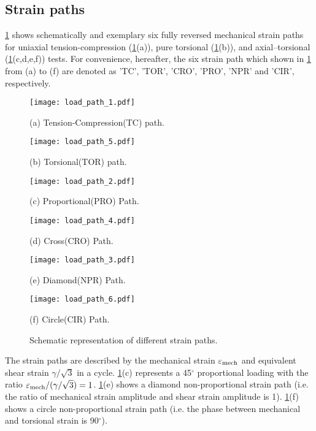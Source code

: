 \subsection{Strain paths}
\noindent
\ref{Fig:LoadPath} shows schematically and exemplary six fully reversed mechanical strain paths for uniaxial tension-compression (\ref{Fig:LoadPath}(a)), pure torsional (\ref{Fig:LoadPath}(b)), and axial–torsional (\ref{Fig:LoadPath}(c,d,e,f)) tests.
For convenience, hereafter, the six strain path which shown in \ref{Fig:LoadPath} from (a) to (f) are denoted as 'TC', 'TOR', 'CRO', 'PRO', 'NPR' and 'CIR', respectively.
\begin{figure}[ht]
  \begin{minipage}[t]{0.33\linewidth}
    \centering
    \texttt{[image: load\_path\_1.pdf]}
    \centerline{\small (a) Tension-Compression(TC) path.}
  \end{minipage}
  \begin{minipage}[t]{0.33\linewidth}
    \centering
    \texttt{[image: load\_path\_5.pdf]}
    \centerline{\small (b) Torsional(TOR) path.}
  \end{minipage}
  \begin{minipage}[t]{0.33\linewidth}
    \centering
    \texttt{[image: load\_path\_2.pdf]}
    \centerline{\small (c) Proportional(PRO) Path.}
  \end{minipage}%

  \begin{minipage}[t]{0.33\linewidth}
    \centering
    \texttt{[image: load\_path\_4.pdf]}
    \centerline{\small (d) Cross(CRO) Path.}
  \end{minipage}
  \begin{minipage}[t]{0.33\linewidth}
    \centering
    \texttt{[image: load\_path\_3.pdf]}
    \centerline{\small (e) Diamond(NPR) Path.}
  \end{minipage}
  \begin{minipage}[t]{0.33\linewidth}
    \centering
    \texttt{[image: load\_path\_6.pdf]}
    \centerline{\small (f) Circle(CIR) Path.}
  \end{minipage}%
  \caption{Schematic representation of different strain paths.}
  \label{Fig:LoadPath}
\end{figure}
The strain paths are described by the mechanical strain $\varepsilon_{\rm{mech}}$ and equivalent shear strain $\gamma/\sqrt{3}$ in a cycle.
\ref{Fig:LoadPath}(c) represents a 45$^\circ$ proportional loading with the ratio $\varepsilon_{\rm{mech}}/(\gamma/\sqrt{3})=1$. \ref{Fig:LoadPath}(e) shows a diamond non-proportional strain path (i.e. the ratio of mechanical strain amplitude and shear strain amplitude is 1). \ref{Fig:LoadPath}(f) shows a circle non-proportional strain path (i.e. the phase between mechanical and torsional strain is 90$^\circ$).
